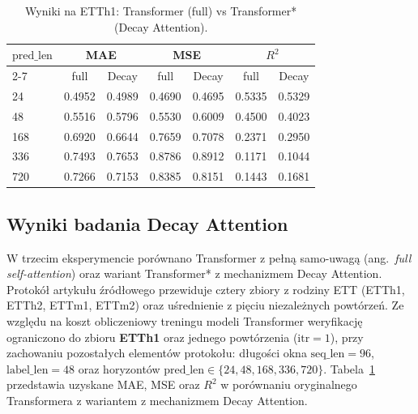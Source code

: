 \begin{table}[htbp]
  \centering
  \caption{Wyniki na ETTh1: Transformer (full) vs Transformer* (Decay Attention).}
  \label{tab:rule04-etth1}
  \begin{tabular}{lcccccc}
    \hline
    $\mathrm{pred\_len}$ & \multicolumn{2}{c}{MAE} & \multicolumn{2}{c}{MSE} & \multicolumn{2}{c}{$R^2$} \\
    \cline{2-7}
     & full & Decay & full & Decay & full & Decay \\
    \hline
    24 & 0.4952 & 0.4989 & 0.4690 & 0.4695 & 0.5335 & 0.5329 \\
    48 & 0.5516 & 0.5796 & 0.5530 & 0.6009 & 0.4500 & 0.4023 \\
    168 & 0.6920 & 0.6644 & 0.7659 & 0.7078 & 0.2371 & 0.2950 \\
    336 & 0.7493 & 0.7653 & 0.8786 & 0.8912 & 0.1171 & 0.1044 \\
    720 & 0.7266 & 0.7153 & 0.8385 & 0.8151 & 0.1443 & 0.1681 \\
    \hline
  \end{tabular}
\end{table}

\subsection{Wyniki badania Decay Attention}
\label{subsec:WynikiDA}
W trzecim eksperymencie porównano Transformer z pełną samo-uwagą (ang.\ \textit{full self-attention}) oraz wariant Transformer* z mechanizmem Decay Attention. Protokół artykułu źródłowego przewiduje cztery zbiory z rodziny ETT (ETTh1, ETTh2, ETTm1, ETTm2) oraz uśrednienie z pięciu niezależnych powtórzeń. Ze względu na koszt obliczeniowy treningu modeli Transformer weryfikację ograniczono do zbioru \textbf{ETTh1} oraz jednego powtórzenia ($\mathrm{itr}=1$), przy zachowaniu pozostałych elementów protokołu: długości okna $\mathrm{seq\_len}=96$, $\mathrm{label\_len}=48$ oraz horyzontów $\mathrm{pred\_len}\in\{24,48,168,336,720\}$. Tabela~\ref{tab:rule04-etth1} przedstawia uzyskane MAE, MSE oraz $R^2$ w porównaniu oryginalnego Transformera z wariantem z mechanizmem Decay Attention. 

